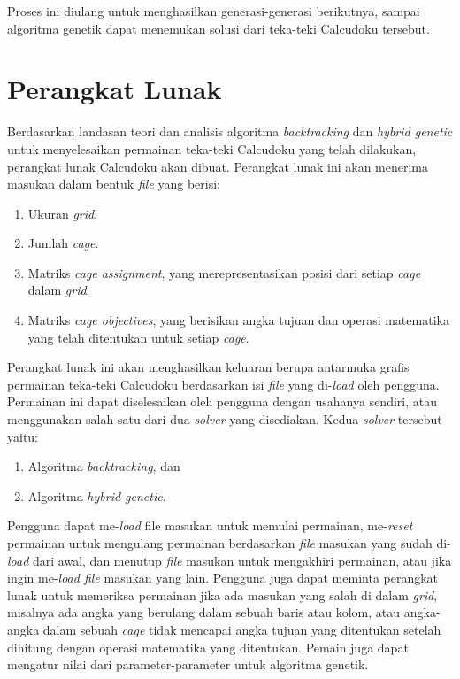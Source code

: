 Proses ini diulang untuk menghasilkan generasi-generasi berikutnya, sampai algoritma genetik dapat menemukan solusi dari teka-teki Calcudoku tersebut.

\section{Perangkat Lunak}
\label{sec:analisispl}

Berdasarkan landasan teori dan analisis algoritma \textit{backtracking} dan \textit{hybrid genetic} untuk menyelesaikan permainan teka-teki Calcudoku yang telah dilakukan, perangkat lunak Calcudoku akan dibuat. Perangkat lunak ini akan menerima masukan dalam bentuk \textit{file} yang berisi:

\begin{enumerate}
\item Ukuran \textit{grid}.
\item Jumlah \textit{cage}.
\item Matriks \textit{cage assignment}, yang merepresentasikan posisi dari setiap \textit{cage} dalam \textit{grid}.
\item Matriks \textit{cage objectives}, yang berisikan angka tujuan dan operasi matematika yang telah ditentukan untuk setiap \textit{cage}.
\end{enumerate}

Perangkat lunak ini akan menghasilkan keluaran berupa antarmuka grafis permainan teka-teki Calcudoku berdasarkan isi \textit{file}  yang di-\textit{load} oleh pengguna. Permainan ini dapat diselesaikan oleh pengguna dengan usahanya sendiri, atau menggunakan salah satu dari dua \textit{solver} yang disediakan.  Kedua \textit{solver} tersebut yaitu:

\begin{enumerate}
\item Algoritma \textit{backtracking}, dan
\item Algoritma \textit{hybrid genetic}.
\end{enumerate}

Pengguna dapat me-\textit{load} file masukan untuk memulai permainan, me-\textit{reset} permainan untuk mengulang permainan berdasarkan \textit{file} masukan yang sudah di-\textit{load} dari awal, dan menutup \textit{file} masukan untuk mengakhiri permainan, atau jika ingin me-\textit{load file} masukan yang lain. Pengguna juga dapat meminta perangkat lunak untuk memeriksa permainan jika ada masukan yang salah di dalam \textit{grid}, misalnya ada angka yang berulang dalam sebuah baris atau kolom, atau angka-angka dalam sebuah \textit{cage} tidak mencapai angka tujuan yang ditentukan setelah dihitung dengan operasi matematika yang ditentukan. Pemain juga dapat mengatur nilai dari parameter-parameter untuk algoritma genetik.

